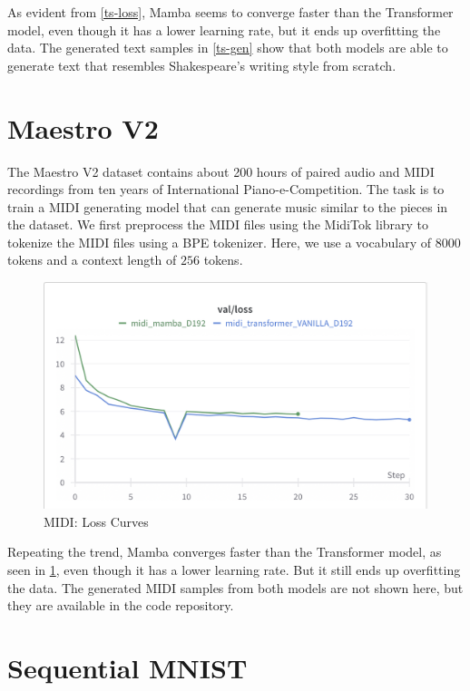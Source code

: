\documentclass[12pt,a4paper]{report}
\begin{document}
As evident from \ref{ts-loss}, Mamba seems to converge faster than the Transformer model, even though it has a lower learning rate, but it ends up overfitting the data. The generated text samples in \ref{ts-gen} show that both models are able to generate text that resembles Shakespeare's writing style from scratch.

\section{Maestro V2}

The Maestro V2 dataset \cite{maestrov2} contains about 200 hours of paired audio and MIDI recordings from ten years of International Piano-e-Competition. The task is to train a MIDI generating model that can generate music similar to the pieces in the dataset. We first preprocess the MIDI files using the MidiTok library to tokenize the MIDI files using a BPE tokenizer. Here, we use a vocabulary of $8000$ tokens and a context length of $256$ tokens.

\begin{figure}[ht]
    \centerline{\includegraphics[scale=0.45]{experiments/midi/midi_loss.png}}
    \caption{MIDI: Loss Curves}
    \label{midi-loss}
\end{figure}

Repeating the trend, Mamba converges faster than the Transformer model, as seen in \ref{midi-loss}, even though it has a lower learning rate. But it still ends up overfitting the data. The generated MIDI samples from both models are not shown here, but they are available in the code repository.

\section{Sequential MNIST}
\end{document}
